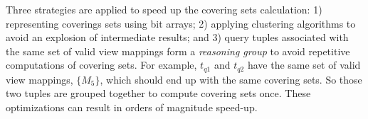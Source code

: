 \begin{example}
Three strategies are applied to speed up the covering sets calculation: 1) representing coverings sets using bit arrays; 2) applying clustering algorithms to avoid an explosion of intermediate results; and 3) query tuples associated with the same set of valid view mappings form a {\em reasoning group} to avoid repetitive computations of covering sets. For example, $t_{q1}$ and $t_{q2}$ have the same set of valid view mappings, $\{M_5\}$, which should end up with the same covering sets. So those two tuples are grouped together to compute covering sets once. These optimizations can result in orders of magnitude speed-up. %
\end{example}



